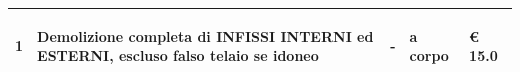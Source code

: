 \documentclass[a4paper]{article}
\begin{document}
\begin{tabular}{ | L{10mm} |  L{86mm} | L{12mm} | L{12mm} | L{16mm} | }
                                   \vspace{2.5mm}
                                   \begin{spacing}{0}
                                1
                                   \end{spacing} &
                                   \vspace{2.5mm}
                                   \begin{spacing}{0}
                                Demolizione completa di INFISSI INTERNI ed ESTERNI, escluso falso telaio se idoneo
                                   \end{spacing} &
                                   \vspace{2.5mm}
                                   \begin{spacing}{0}
                                -
                                   \end{spacing} &
                                   \vspace{2.5mm}
                                   \begin{spacing}{0}
                                a corpo
                                   \end{spacing} &
                                   \vspace{2.5mm}
                                   \begin{spacing}{0}
                                     \euro\hfill 
                                 15.0
                                   \end{spacing} \\
                                   \hline


\end{tabular}
\end{document}
